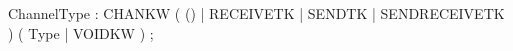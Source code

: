 %
%
%
\begin{rail}
ChannelType : CHANKW ( () | RECEIVETK | SENDTK | SENDRECEIVETK )
              ( Type | VOIDKW )
            ;
\end{rail}
